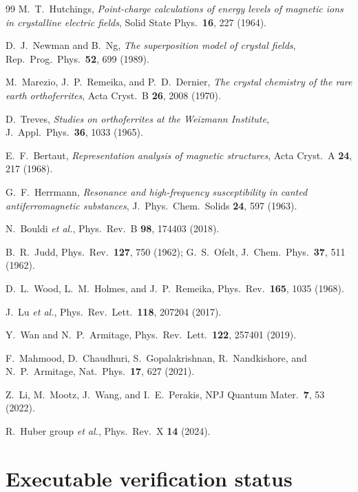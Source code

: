 \documentclass[reprint,amsmath,amssymb,aps,prb,longbibliography]{revtex4-2}
\begin{document}
\begin{thebibliography}{99}
M.~T.~Hutchings,
\emph{Point-charge calculations of energy levels of magnetic ions in crystalline electric fields},
Solid State Phys.\ \textbf{16}, 227 (1964).

D.~J.~Newman and B.~Ng,
\emph{The superposition model of crystal fields},
Rep.\ Prog.\ Phys.\ \textbf{52}, 699 (1989).

M.~Marezio, J.~P.~Remeika, and P.~D.~Dernier,
\emph{The crystal chemistry of the rare earth orthoferrites},
Acta Cryst.\ B \textbf{26}, 2008 (1970).

D.~Treves,
\emph{Studies on orthoferrites at the Weizmann Institute},
J.\ Appl.\ Phys.\ \textbf{36}, 1033 (1965).

E.~F.~Bertaut,
\emph{Representation analysis of magnetic structures},
Acta Cryst.\ A \textbf{24}, 217 (1968).

G.~F.~Herrmann,
\emph{Resonance and high-frequency susceptibility in canted antiferromagnetic substances},
J.\ Phys.\ Chem.\ Solids \textbf{24}, 597 (1963).

N.~Bouldi \emph{et al.}, Phys.\ Rev.\ B \textbf{98}, 174403 (2018).

B.~R.~Judd, Phys.\ Rev.\ \textbf{127}, 750 (1962);
G.~S.~Ofelt, J.\ Chem.\ Phys.\ \textbf{37}, 511 (1962).

D.~L.~Wood, L.~M.~Holmes, and J.~P.~Remeika,
Phys.\ Rev.\ \textbf{165}, 1035 (1968).

J.~Lu \emph{et al.}, Phys.\ Rev.\ Lett.\ \textbf{118}, 207204 (2017).

Y.~Wan and N.~P.~Armitage, Phys.\ Rev.\ Lett.\ \textbf{122}, 257401 (2019).

F.~Mahmood, D.~Chaudhuri, S.~Gopalakrishnan, R.~Nandkishore, and N.~P.~Armitage,
Nat.\ Phys.\ \textbf{17}, 627 (2021).

Z.~Li, M.~Mootz, J.~Wang, and I.~E.~Perakis, NPJ Quantum Mater.\ \textbf{7}, 53 (2022).

R.~Huber group \emph{et al.}, Phys.\ Rev.\ X \textbf{14} (2024).

\end{thebibliography}

\appendix
\section{Executable verification status}
\label{app:script}
\end{document}
